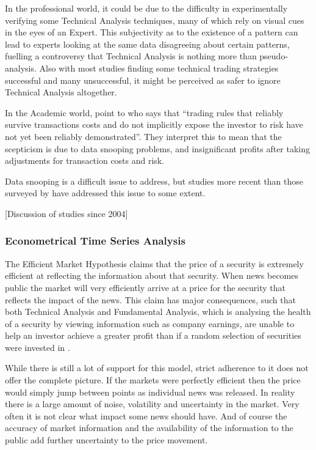 \documentclass{article}
\theoremstyle{definition}
\begin{document}
In the professional world, it could be due to the difficulty in experimentally verifying some Technical Analysis techniques, many of which rely on visual cues in the eyes of an Expert. This subjectivity as to the existence of a pattern can lead to experts looking at the same data disagreeing about certain patterns, fuelling a controversy that Technical Analysis is nothing more than pseudo-analysis. Also with most studies finding some technical trading strategies successful and many unsuccessful, it might be perceived as safer to ignore Technical Analysis altogether.

In the Academic world, \cite{taprofitability} point to \cite{assetpricing} who says that ``trading rules that reliably survive transactions costs and do not implicitly expose the investor to risk have not yet been reliably demonstrated''. They interpret this to mean that the scepticism is due to data snooping problems, and insignificant profits after taking adjustments for transaction costs and risk.

Data snooping is a difficult issue to address, but studies more recent than those surveyed by \cite{taprofitability} have addressed this issue to some extent.

[Discussion of studies since 2004]

\subsubsection{Econometrical Time Series Analysis}

The Efficient Market Hypothesis claims that the price of a security is extremely efficient at reflecting the information about that security. When news becomes public the market will very efficiently arrive at a price for the security that reflects the impact of the news. This claim has major consequences, such that both Technical Analysis and Fundamental Analysis, which is analysing the health of a security by viewing information such as company earnings, are unable to help an investor achieve a greater profit than if a random selection of securities were invested in \citep{emhAndCritics}. 

While there is still a lot of support for this model, strict adherence to it does not offer the complete picture. If the markets were perfectly efficient then the price would simply jump between points as individual news was released. In reality there is a large amount of noise, volatility and uncertainty in the market. Very often it is not clear what impact some news should have. And of course the accuracy of market information and the availability of the information to the public add further uncertainty to the price movement.
\end{document}
